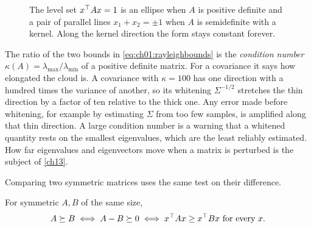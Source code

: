 \begin{figure}[tbp]
\centering
{}
\caption{The level set $x^{\top} Ax=1$ is an ellipse when $A$ is positive definite
and a pair of parallel lines $x_1+x_2=\pm1$ when $A$ is semidefinite with a
kernel. Along the kernel direction the form stays constant forever.}
\label{fig:ch01:levels}
\end{figure}

The ratio of the two bounds in \cref{eq:ch01:rayleighbounds} is the
\emph{condition number} $\kappa(A)=\lambda_{\max}/\lambda_{\min}$ of a positive
definite matrix. For a covariance it says how elongated the cloud is. A
covariance with $\kappa=100$ has one direction with a hundred times the
variance of another, so its whitening $\Sigma^{-1/2}$ stretches the thin
direction by a factor of ten relative to the thick one. Any error made before
whitening, for example by estimating $\Sigma$ from too few samples, is
amplified along that thin direction. A large condition number is a warning
that a whitened quantity rests on the smallest eigenvalues, which are the
least reliably estimated. How far eigenvalues and eigenvectors move when a
matrix is perturbed is the subject of \cref{ch13}.

Comparing two symmetric matrices uses the same test on their difference.

\begin{definition}\label{def:ch01:loewner}
For symmetric $A,B$ of the same size,
\begin{equation}\label{eq:ch01:loewner}
A\succeq B \iff A-B\succeq 0 \iff x^{\top} Ax\ge x^{\top} Bx\ \text{for every } x .
\end{equation}
\end{definition}

